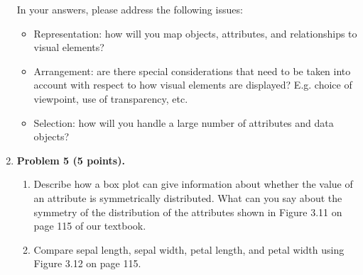 \documentclass{article}%
\begin{document}
\begin{enumerate}
In your answers, please address the following issues:
\begin{itemize}
\item Representation: how will you map objects, attributes, and relationships to visual elements?
\item Arrangement: are there special considerations that need to be taken into account with respect to how visual elements are displayed? E.g. choice of viewpoint, use of transparency, etc.
\item Selection: how will you handle a large number of attributes and data objects?
\end{itemize}

\item \textbf{Problem 5 (5 points).}
 \begin{enumerate}
		\item Describe how a box plot can give information about whether the value of an attribute is symmetrically distributed. What can you say about the symmetry of the distribution of the attributes shown in Figure 3.11 on page 115 of our textbook.
		\item Compare sepal length, sepal width, petal length, and petal width using Figure 3.12 on page 115.
 \end{enumerate}



\end{enumerate}
\end{document}
